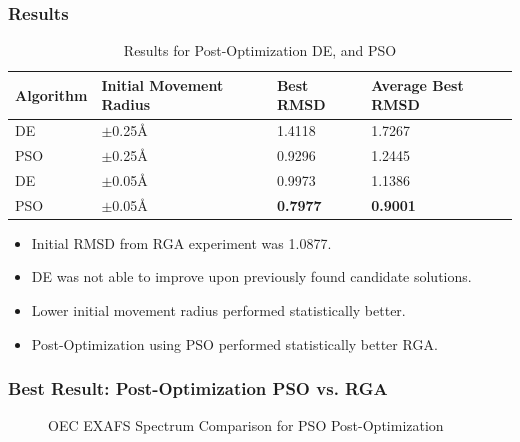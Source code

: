 \documentclass[10pt]{beamer}
\begin{document}
\begin{frame}
	\frametitle{Results}

	\begin{table}
		\centering
		\begin{tabular}{ | l | l | l | l | }
		  \hline
			Algorithm & Initial Movement Radius & Best RMSD & Average Best RMSD \\ \hline \hline
			DE & $\pm$0.25\AA & 1.4118 & 1.7267 \\ \hline
			PSO & $\pm$0.25\AA & 0.9296 & 1.2445 \\ \hline
			DE & $\pm$0.05\AA & 0.9973 & 1.1386 \\ \hline
			PSO & $\pm$0.05\AA & \textbf{0.7977} & \textbf{0.9001} \\ \hline
		\end{tabular}
		\caption{Results for Post-Optimization DE, and PSO}
	\end{table}

	\begin{itemize}
		\item Initial RMSD from RGA experiment was 1.0877.
		\item DE was not able to improve upon previously found candidate solutions.
		\item Lower initial movement radius performed statistically better.
		\item Post-Optimization using PSO performed statistically better RGA.
	\end{itemize}

\end{frame}

\begin{frame}
	\frametitle{Best Result: Post-Optimization PSO vs. RGA}

	\begin{figure}
		\caption{OEC EXAFS Spectrum Comparison for PSO Post-Optimization}
	\end{figure}

\end{frame}
\end{document}
